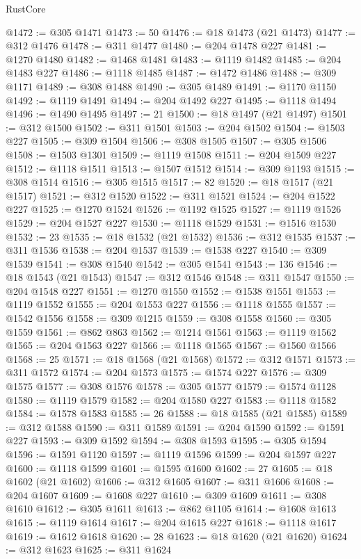 \begin{lexlean}{RustCore}
\begin{coremodule}
@1472 := @305 @1471
@1473 := 50
@1476 := @18 @1473 (@21 @1473)
@1477 := @312 @1476
@1478 := @311 @1477
@1480 := @204 @1478 @227
@1481 := @1270 @1480
@1482 := @1468 @1481
@1483 := @1119 @1482
@1485 := @204 @1483 @227
@1486 := @1118 @1485
@1487 := @1472 @1486
@1488 := @309 @1171
@1489 := @308 @1488
@1490 := @305 @1489
@1491 := @1170 @1150
@1492 := @1119 @1491
@1494 := @204 @1492 @227
@1495 := @1118 @1494
@1496 := @1490 @1495
@1497 := 21
@1500 := @18 @1497 (@21 @1497)
@1501 := @312 @1500
@1502 := @311 @1501
@1503 := @204 @1502
@1504 := @1503 @227
@1505 := @309 @1504
@1506 := @308 @1505
@1507 := @305 @1506
@1508 := @1503 @1301
@1509 := @1119 @1508
@1511 := @204 @1509 @227
@1512 := @1118 @1511
@1513 := @1507 @1512
@1514 := @309 @1193
@1515 := @308 @1514
@1516 := @305 @1515
@1517 := 82
@1520 := @18 @1517 (@21 @1517)
@1521 := @312 @1520
@1522 := @311 @1521
@1524 := @204 @1522 @227
@1525 := @1270 @1524
@1526 := @1192 @1525
@1527 := @1119 @1526
@1529 := @204 @1527 @227
@1530 := @1118 @1529
@1531 := @1516 @1530
@1532 := 23
@1535 := @18 @1532 (@21 @1532)
@1536 := @312 @1535
@1537 := @311 @1536
@1538 := @204 @1537
@1539 := @1538 @227
@1540 := @309 @1539
@1541 := @308 @1540
@1542 := @305 @1541
@1543 := 136
@1546 := @18 @1543 (@21 @1543)
@1547 := @312 @1546
@1548 := @311 @1547
@1550 := @204 @1548 @227
@1551 := @1270 @1550
@1552 := @1538 @1551
@1553 := @1119 @1552
@1555 := @204 @1553 @227
@1556 := @1118 @1555
@1557 := @1542 @1556
@1558 := @309 @1215
@1559 := @308 @1558
@1560 := @305 @1559
@1561 := @862 @863
@1562 := @1214 @1561
@1563 := @1119 @1562
@1565 := @204 @1563 @227
@1566 := @1118 @1565
@1567 := @1560 @1566
@1568 := 25
@1571 := @18 @1568 (@21 @1568)
@1572 := @312 @1571
@1573 := @311 @1572
@1574 := @204 @1573
@1575 := @1574 @227
@1576 := @309 @1575
@1577 := @308 @1576
@1578 := @305 @1577
@1579 := @1574 @1128
@1580 := @1119 @1579
@1582 := @204 @1580 @227
@1583 := @1118 @1582
@1584 := @1578 @1583
@1585 := 26
@1588 := @18 @1585 (@21 @1585)
@1589 := @312 @1588
@1590 := @311 @1589
@1591 := @204 @1590
@1592 := @1591 @227
@1593 := @309 @1592
@1594 := @308 @1593
@1595 := @305 @1594
@1596 := @1591 @1120
@1597 := @1119 @1596
@1599 := @204 @1597 @227
@1600 := @1118 @1599
@1601 := @1595 @1600
@1602 := 27
@1605 := @18 @1602 (@21 @1602)
@1606 := @312 @1605
@1607 := @311 @1606
@1608 := @204 @1607
@1609 := @1608 @227
@1610 := @309 @1609
@1611 := @308 @1610
@1612 := @305 @1611
@1613 := @862 @1105
@1614 := @1608 @1613
@1615 := @1119 @1614
@1617 := @204 @1615 @227
@1618 := @1118 @1617
@1619 := @1612 @1618
@1620 := 28
@1623 := @18 @1620 (@21 @1620)
@1624 := @312 @1623
@1625 := @311 @1624

\end{coremodule}
\end{lexlean}
